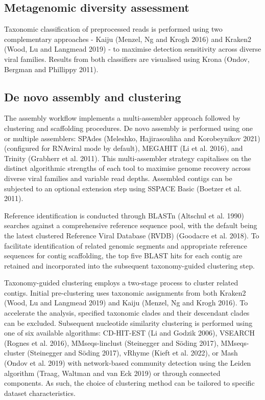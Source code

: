 \subsection{Metagenomic diversity assessment}

Taxonomic classification of preprocessed reads is performed using two complementary approaches - Kaiju (Menzel, Ng and Krogh 2016) and Kraken2 (Wood, Lu and Langmead 2019) - to maximise detection sensitivity across diverse viral families. Results from both classifiers are visualised using Krona (Ondov, Bergman and Phillippy 2011).

\subsection{De novo assembly and clustering}

The assembly workflow implements a multi-assembler approach followed by clustering and scaffolding procedures. De novo assembly is performed using one or multiple assemblers: SPAdes (Meleshko, Hajirasouliha and Korobeynikov 2021) (configured for RNAviral mode by default), MEGAHIT (Li et al. 2016), and Trinity (Grabherr et al. 2011). This multi-assembler strategy capitalises on the distinct algorithmic strengths of each tool to maximise genome recovery across diverse viral families and variable read depths. Assembled contigs can be subjected to an optional extension step using SSPACE Basic (Boetzer et al. 2011).

Reference identification is conducted through BLASTn (Altschul et al. 1990) searches against a comprehensive reference sequence pool, with the default being the latest clustered Reference Viral Database (RVDB) (Goodacre et al. 2018). To facilitate identification of related genomic segments and appropriate reference sequences for contig scaffolding, the top five BLAST hits for each contig are retained and incorporated into the subsequent taxonomy-guided clustering step.

Taxonomy-guided clustering employs a two-stage process to cluster related contigs. Initial pre-clustering uses taxonomic assignments from both Kraken2 (Wood, Lu and Langmead 2019) and Kaiju (Menzel, Ng and Krogh 2016). To accelerate the analysis, specified taxonomic clades and their descendant clades can be excluded. Subsequent nucleotide similarity clustering is performed using one of six available algorithms: CD-HIT-EST (Li and Godzik 2006), VSEARCH (Rognes et al. 2016), MMseqs-linclust (Steinegger and Söding 2017), MMseqs-cluster (Steinegger and Söding 2017), vRhyme (Kieft et al. 2022), or Mash (Ondov et al. 2019) with network-based community detection using the Leiden algorithm (Traag, Waltman and van Eck 2019) or through connected components. As such, the choice of clustering method can be tailored to specific dataset characteristics.

